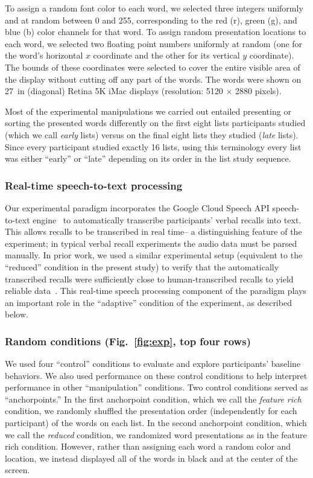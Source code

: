 \documentclass[11pt]{article}
\begin{document}
To assign a random font color to each word, we selected three integers
uniformly and at random between 0 and 255, corresponding to the red (r), green
(g), and blue (b) color channels for that word. To assign random presentation
locations to each word, we selected two floating point numbers uniformly at
random (one for the word's horizontal $x$ coordinate and the other for its
vertical $y$ coordinate). The bounds of these coordinates were selected to
cover the entire visible area of the display without cutting off any part of
the words. The words were shown on 27~in (diagonal) Retina 5K iMac displays
(resolution: 5120 $\times$ 2880 pixels).

Most of the experimental manipulations we carried out entailed presenting or
sorting the presented words differently on the first eight lists participants
studied (which we call \textit{early} lists) versus on the final eight lists
they studied (\textit{late} lists). Since every participant studied exactly 16
lists, using this terminology every list was either ``early'' or ``late''
depending on its order in the list study sequence.


\subsubsection*{Real-time speech-to-text processing}

Our experimental paradigm incorporates the Google Cloud Speech API
speech-to-text engine~\citep{HalpEtal16} to automatically transcribe
participants' verbal recalls into text. This allows recalls to be transcribed
in real time-- a distinguishing feature of the experiment; in typical verbal
recall experiments the audio data must be parsed manually. In prior work, we
used a similar experimental setup (equivalent to the ``reduced'' condition in
the present study) to verify that the automatically transcribed recalls were
sufficiently close to human-transcribed recalls to yield reliable
data~\citep{ZimaEtal18}. This real-time speech processing component of the
paradigm plays an important role in the ``adaptive'' condition of the
experiment, as described below.

\subsubsection*{Random conditions (Fig.~\ref{fig:exp}, top four rows)}

We used four ``control'' conditions to evaluate and explore participants'
baseline behaviors. We also used performance on these control conditions to
help interpret performance in other ``manipulation'' conditions. Two control
conditions served as ``anchorpoints.'' In the first anchorpoint condition,
which we call the \textit{feature rich} condition, we randomly shuffled the
presentation order (independently for each participant) of the words on each
list. In the second anchorpoint condition, which we call the \textit{reduced}
condition, we randomized word presentations as in the feature rich condition.
However, rather than assigning each word a random color and location, we
instead displayed all of the words in black and at the center of the screen.
\end{document}
